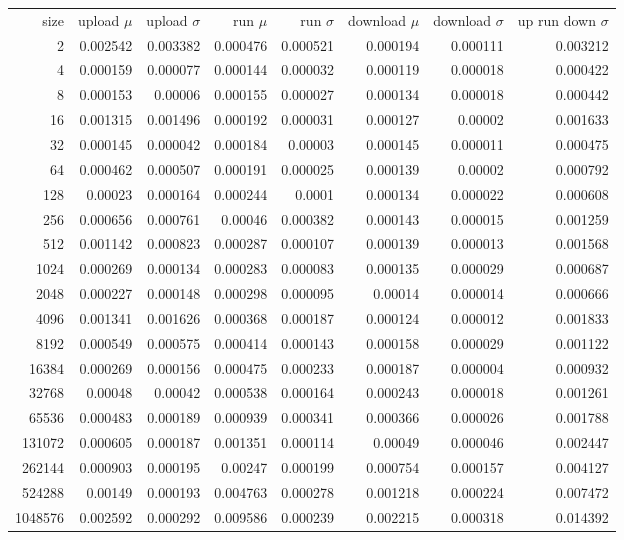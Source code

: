 \begin{tabular}{r r r r r r r r}
size & upload $\mu$  & upload $\sigma$ & run $\mu$ & run $\sigma$ & download $\mu$ & download $\sigma$ & up run down $\sigma$ \\
2 & 0.002542 & 0.003382 & 0.000476 & 0.000521 & 0.000194 & 0.000111 & 0.003212 \\
4 & 0.000159 & 0.000077 & 0.000144 & 0.000032 & 0.000119 & 0.000018 & 0.000422 \\
8 & 0.000153 & 0.00006 & 0.000155 & 0.000027 & 0.000134 & 0.000018 & 0.000442 \\
16 & 0.001315 & 0.001496 & 0.000192 & 0.000031 & 0.000127 & 0.00002 & 0.001633 \\
32 & 0.000145 & 0.000042 & 0.000184 & 0.00003 & 0.000145 & 0.000011 & 0.000475 \\
64 & 0.000462 & 0.000507 & 0.000191 & 0.000025 & 0.000139 & 0.00002 & 0.000792 \\
128 & 0.00023 & 0.000164 & 0.000244 & 0.0001 & 0.000134 & 0.000022 & 0.000608 \\
256 & 0.000656 & 0.000761 & 0.00046 & 0.000382 & 0.000143 & 0.000015 & 0.001259 \\
512 & 0.001142 & 0.000823 & 0.000287 & 0.000107 & 0.000139 & 0.000013 & 0.001568 \\
1024 & 0.000269 & 0.000134 & 0.000283 & 0.000083 & 0.000135 & 0.000029 & 0.000687 \\
2048 & 0.000227 & 0.000148 & 0.000298 & 0.000095 & 0.00014 & 0.000014 & 0.000666 \\
4096 & 0.001341 & 0.001626 & 0.000368 & 0.000187 & 0.000124 & 0.000012 & 0.001833 \\
8192 & 0.000549 & 0.000575 & 0.000414 & 0.000143 & 0.000158 & 0.000029 & 0.001122 \\
16384 & 0.000269 & 0.000156 & 0.000475 & 0.000233 & 0.000187 & 0.000004 & 0.000932 \\
32768 & 0.00048 & 0.00042 & 0.000538 & 0.000164 & 0.000243 & 0.000018 & 0.001261 \\
65536 & 0.000483 & 0.000189 & 0.000939 & 0.000341 & 0.000366 & 0.000026 & 0.001788 \\
131072 & 0.000605 & 0.000187 & 0.001351 & 0.000114 & 0.00049 & 0.000046 & 0.002447 \\
262144 & 0.000903 & 0.000195 & 0.00247 & 0.000199 & 0.000754 & 0.000157 & 0.004127 \\
524288 & 0.00149 & 0.000193 & 0.004763 & 0.000278 & 0.001218 & 0.000224 & 0.007472 \\
1048576 & 0.002592 & 0.000292 & 0.009586 & 0.000239 & 0.002215 & 0.000318 & 0.014392 \\

\end{tabular}
